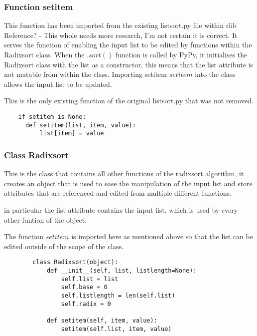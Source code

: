 \documentclass[12pt]{article}
\begin{document}
\subsubsection{Function setitem}
This function has been imported from the existing listsort.py file within rlib {\color{red} Reference? - This whole needs more research, I'm not certain it is correct}. It serves the function of enabling the input list to be edited by functions within the Radixsort class. When the $.sort()$ function is called by PyPy, it initialises the Radixsort class with the list as a constructor, this means that the list attribute is not mutable from within the class. Importing setitem $setitem$ into the class allows the input list to be updated.
\par
This is the only existing function of the original listsort.py that was not removed.
\begin{lstlisting}
    if setitem is None:
      def setitem(list, item, value):
          list[item] = value
  \end{lstlisting}


\subsubsection{Class Radixsort}
This is the class that contains all other functions of the radixsort algorithm, it creates an object that is used to ease the manipulation of the input list and store attributes that are referenced and edited from multiple different functions.\par in particular the list attribute contains the input list, which is used by every other funtion of the object.
\par
The function $setitem$ is imported here as mentioned above so that the list can be edited outside of the scope of the class.
\begin{lstlisting}
        class Radixsort(object):
            def __init__(self, list, listlength=None):
                self.list = list
                self.base = 0
                self.listlength = len(self.list)
                self.radix = 0
    
            def setitem(self, item, value):
                setitem(self.list, item, value)
      \end{lstlisting}
\end{document}
